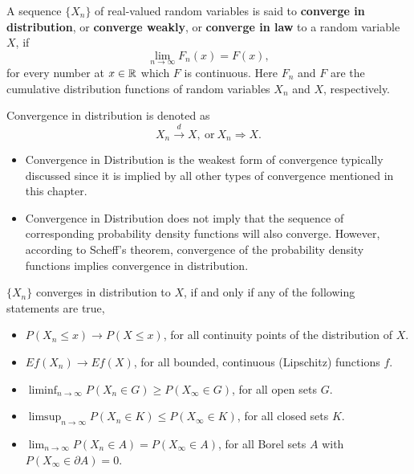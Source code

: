\begin{definition} \label{def:convergence-in-distribution}
	A sequence $\{X_n\}$ of real-valued random variables is said to \textbf{converge in distribution}, or \textbf{converge weakly}, or \textbf{converge in law} to a random variable $X$, if
	\begin{equation}
		\lim_{n\to\infty}F_n(x)=F(x),
	\end{equation}
	for every number at $x\in{\mathbb R}$ which $F$ is continuous. Here $F_n$ and $F$ are the cumulative distribution functions of random variables $X_n$ and $X$, respectively.

	Convergence in distribution is denoted as
	\begin{equation}
		X_n \stackrel{d}{\rightarrow} X, \ \text{or}\  X_n \Rightarrow X.
	\end{equation}
\end{definition}

\begin{itemize}
	\item Convergence in Distribution is the weakest form of convergence typically discussed since it is implied by all other types of convergence mentioned in this chapter.
	\item Convergence in Distribution does not imply that the sequence of corresponding probability density functions will also converge. However, according to Scheff's theorem, convergence of the probability density functions implies convergence in distribution.
\end{itemize}

\begin{theorem} \label{thm:portmanteau-lemma}
	$\{X_n\}$ converges in distribution to $X$, if and only if any of the following statements are true,
	\begin{itemize}
		\item $P(X_n\leq x)\rightarrow P(X\leq x)$, for all continuity points of the distribution of $X$.
		\item $Ef(X_n)\rightarrow Ef(X)$, for all bounded, continuous (Lipschitz) functions $f$.
		\item $\liminf_{n\rightarrow\infty}P\left(X_{n} \in G\right)\geq P\left(X_{\infty}\in G\right)$, for all open sets $G$.
		\item $\limsup_{n \rightarrow\infty}P\left(X_{n} \in K\right) \leq P\left(X_{\infty} \in K\right)$, for all closed sets $K$.
		\item $\lim_{n\rightarrow\infty}P\left(X_{n}\in A\right)=P\left(X_{\infty}\in A\right)$, for all Borel sets $A$ with $P\left(X_{\infty}\in \partial A\right)=0$.
	\end{itemize}
\end{theorem}

